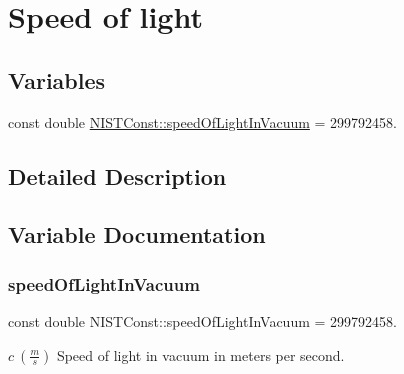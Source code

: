 \hypertarget{group___n_i_s_t_const-_speed_of_light}{}\section{Speed of light}
\label{group___n_i_s_t_const-_speed_of_light}
\subsection*{Variables}
\begin{DoxyCompactItemize}
\item 
const double \hyperlink{group___n_i_s_t_const-_speed_of_light_gacb4a04d9cca33259effabdd28c28e964}{N\+I\+S\+T\+Const\+::speed\+Of\+Light\+In\+Vacuum} = 299792458.
\end{DoxyCompactItemize}


\subsection{Detailed Description}


\subsection{Variable Documentation}
\mbox{\label{group___n_i_s_t_const-_speed_of_light_gacb4a04d9cca33259effabdd28c28e964}} 
\subsubsection{\texorpdfstring{speed\+Of\+Light\+In\+Vacuum}{speedOfLightInVacuum}}
{\footnotesize\ttfamily const double N\+I\+S\+T\+Const\+::speed\+Of\+Light\+In\+Vacuum = 299792458.}

$c \ (\frac{m}{s})$ Speed of light in vacuum in meters per second. 